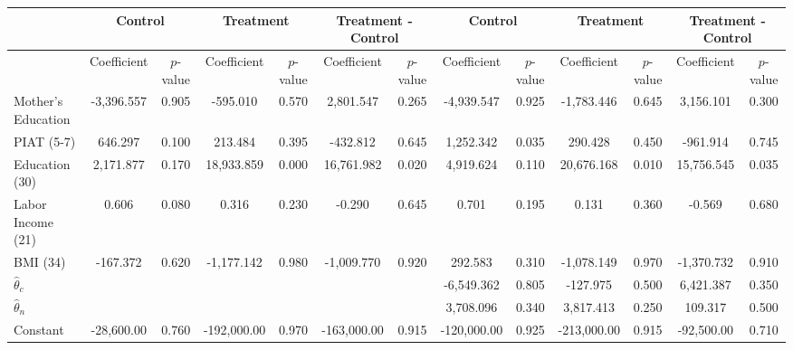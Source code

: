 \begin{tabular}{lcccccccccccc} \toprule
&\multicolumn{2}{c}{Control} & \multicolumn{2}{c}{Treatment} & \multicolumn{2}{c}{Treatment - Control} & \multicolumn{2}{c}{Control} & \multicolumn{2}{c}{Treatment} & \multicolumn{2}{c}{Treatment - Control} \\ \midrule
 & Coefficient  & $p$-value  & Coefficient  & $p$-value & Coefficient  & $p$-value  & Coefficient  & $p$-value  & Coefficient  & $p$-value  & Coefficient  & $p$-value \\ \midrule
Mother's Education & -3,396.557 &     0.905 &  -595.010 &     0.570 &  2,801.547 &     0.265 & -4,939.547 &     0.925 & -1,783.446 &     0.645 &  3,156.101 &     0.300 \\  
PIAT (5-7)&   646.297 &     0.100 &   213.484 &     0.395 &  -432.812 &     0.645 &  1,252.342 &     0.035 &   290.428 &     0.450 &  -961.914 &     0.745 \\  
Education (30) &  2,171.877 &     0.170 & 18,933.859 &     0.000 & 16,761.982 &     0.020 &  4,919.624 &     0.110 & 20,676.168 &     0.010 & 15,756.545 &     0.035 \\  
Labor Income (21) &     0.606 &     0.080 &     0.316 &     0.230 &    -0.290 &     0.645 &     0.701 &     0.195 &     0.131 &     0.360 &    -0.569 &     0.680 \\  
BMI (34)  &  -167.372 &     0.620 & -1,177.142 &     0.980 & -1,009.770 &     0.920 &   292.583 &     0.310 & -1,078.149 &     0.970 & -1,370.732 &     0.910 \\  
$\hat{\theta}_{c}$ &         &        &        &        &        &        &-6,549.362 &     0.805 &  -127.975 &     0.500 &  6,421.387 &     0.350 \\  
$\hat{\theta}_{n}$ &         &        &        &        &        &        & 3,708.096 &     0.340 &  3,817.413 &     0.250 &   109.317 &     0.500 \\  
Constant & -28,600.00 &     0.760 & -192,000.00 &     0.970 & -163,000.00 &     0.915 & -120,000.00 &     0.925 & -213,000.00 &     0.915 & -92,500.00 &     0.710 \\  
\bottomrule \end{tabular}
